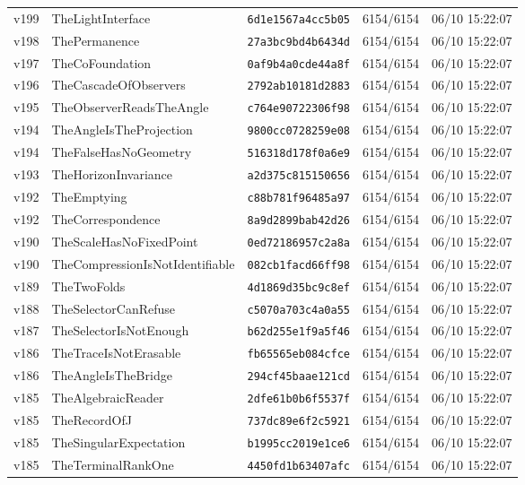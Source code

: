 \documentclass[11pt]{article}
\theoremstyle{definition}\newtheorem{deriv}{Derivação}
\begin{document}
{\begin{longtable}{@{}lllll@{}}
v199 & TheLightInterface & \texttt{6d1e1567a4cc5b05} & 6154/6154 & 06/10 15:22:07 \\
v198 & ThePermanence & \texttt{27a3bc9bd4b6434d} & 6154/6154 & 06/10 15:22:07 \\
v197 & TheCoFoundation & \texttt{0af9b4a0cde44a8f} & 6154/6154 & 06/10 15:22:07 \\
v196 & TheCascadeOfObservers & \texttt{2792ab10181d2883} & 6154/6154 & 06/10 15:22:07 \\
v195 & TheObserverReadsTheAngle & \texttt{c764e90722306f98} & 6154/6154 & 06/10 15:22:07 \\
v194 & TheAngleIsTheProjection & \texttt{9800cc0728259e08} & 6154/6154 & 06/10 15:22:07 \\
v194 & TheFalseHasNoGeometry & \texttt{516318d178f0a6e9} & 6154/6154 & 06/10 15:22:07 \\
v193 & TheHorizonInvariance & \texttt{a2d375c815150656} & 6154/6154 & 06/10 15:22:07 \\
v192 & TheEmptying & \texttt{c88b781f96485a97} & 6154/6154 & 06/10 15:22:07 \\
v192 & TheCorrespondence & \texttt{8a9d2899bab42d26} & 6154/6154 & 06/10 15:22:07 \\
v190 & TheScaleHasNoFixedPoint & \texttt{0ed72186957c2a8a} & 6154/6154 & 06/10 15:22:07 \\
v190 & TheCompressionIsNotIdentifiable & \texttt{082cb1facd66ff98} & 6154/6154 & 06/10 15:22:07 \\
v189 & TheTwoFolds & \texttt{4d1869d35bc9c8ef} & 6154/6154 & 06/10 15:22:07 \\
v188 & TheSelectorCanRefuse & \texttt{c5070a703c4a0a55} & 6154/6154 & 06/10 15:22:07 \\
v187 & TheSelectorIsNotEnough & \texttt{b62d255e1f9a5f46} & 6154/6154 & 06/10 15:22:07 \\
v186 & TheTraceIsNotErasable & \texttt{fb65565eb084cfce} & 6154/6154 & 06/10 15:22:07 \\
v186 & TheAngleIsTheBridge & \texttt{294cf45baae121cd} & 6154/6154 & 06/10 15:22:07 \\
v185 & TheAlgebraicReader & \texttt{2dfe61b0b6f5537f} & 6154/6154 & 06/10 15:22:07 \\
v185 & TheRecordOfJ & \texttt{737dc89e6f2c5921} & 6154/6154 & 06/10 15:22:07 \\
v185 & TheSingularExpectation & \texttt{b1995cc2019e1ce6} & 6154/6154 & 06/10 15:22:07 \\
v185 & TheTerminalRankOne & \texttt{4450fd1b63407afc} & 6154/6154 & 06/10 15:22:07 \\

\end{longtable}}
\end{document}
